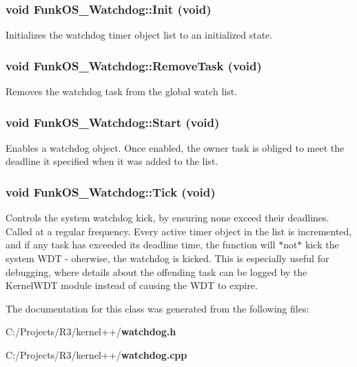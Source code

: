 \subsubsection[{Init}]{\setlength{\rightskip}{0pt plus 5cm}void FunkOS\_\-Watchdog::Init (void)\hspace{0.3cm}{\ttfamily  [static]}}\label{class_funk_o_s___watchdog_ad289326e36b20f7f43a34332a80a6674}
Initializes the watchdog timer object list to an initialized state. 
\subsubsection[{RemoveTask}]{\setlength{\rightskip}{0pt plus 5cm}void FunkOS\_\-Watchdog::RemoveTask (void)}\label{class_funk_o_s___watchdog_af2ee2489b448f0850c1fee40f2445ca5}
Removes the watchdog task from the global watch list. 
\subsubsection[{Start}]{\setlength{\rightskip}{0pt plus 5cm}void FunkOS\_\-Watchdog::Start (void)}\label{class_funk_o_s___watchdog_ae6e2aa436d5dc62e26d3828d7f453432}
Enables a watchdog object. Once enabled, the owner task is obliged to meet the deadline it specified when it was added to the list. 
\subsubsection[{Tick}]{\setlength{\rightskip}{0pt plus 5cm}void FunkOS\_\-Watchdog::Tick (void)\hspace{0.3cm}{\ttfamily  [static]}}\label{class_funk_o_s___watchdog_a21b1e4fe7c213e9f78d2289bfcdb608b}
Controls the system watchdog kick, by ensuring none exceed their deadlines. Called at a regular frequency. Every active timer object in the list is incremented, and if any task has exceeded its deadline time, the function will $\ast$not$\ast$ kick the system WDT -\/ oherwise, the watchdog is kicked. This is especially useful for debugging, where details about the offending task can be logged by the KernelWDT module instead of causing the WDT to expire. 

The documentation for this class was generated from the following files:\begin{DoxyCompactItemize}
\item 
C:/Projects/R3/kernel++/{\bf watchdog.h}\item 
C:/Projects/R3/kernel++/{\bf watchdog.cpp}\end{DoxyCompactItemize}
